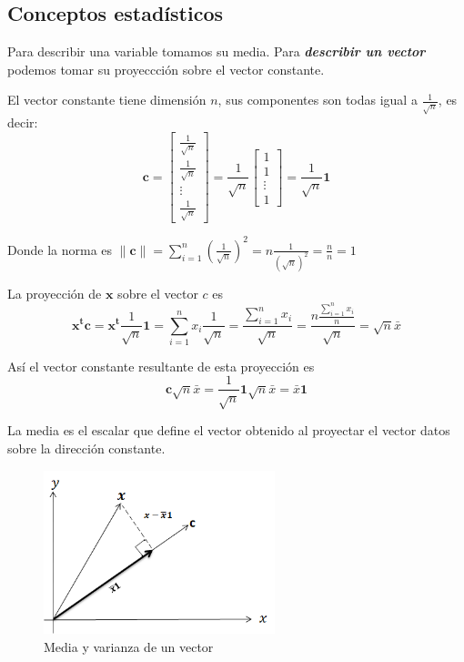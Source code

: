 \documentclass[12pt,letterpaper]{report} %
\begin{document}
\subsection{Conceptos estadísticos}

Para describir una variable tomamos su media. Para \textit{\textbf{describir un vector}} podemos tomar su proyeccción sobre el vector constante.

El vector constante tiene dimensión $n$, sus componentes son todas igual a $\frac{1}{\sqrt{n}}$, es decir:
$$\mathbf{c}=\begin{bmatrix} \frac{1}{\sqrt{n}} \\ \frac{1}{\sqrt{n}} \\ \vdots \\ \frac{1}{\sqrt{n}} \end{bmatrix}=\frac{1}{\sqrt{n}}\begin{bmatrix} 1 \\ 1 \\ \vdots \\ 1 \end{bmatrix}=\frac{1}{\sqrt{n}}\mathbf{1}$$

Donde la norma es $\left\| \mathbf{c} \right\| = \sum_{i=1}^n \left( \frac{1}{\sqrt{n}} \right)^2 = n\frac{1}{(\sqrt{n})^2}=\frac{n}{n}=1$

La proyección de $\mathbf{x}$ sobre el vector $c$ es 
$$\mathbf{x^tc}=\mathbf{x^t}\frac{1}{\sqrt{n}} \mathbf{1}=\sum_{i=1}^n x_i \frac{1}{\sqrt{n}}=\frac{\sum_{i=1}^n x_i}{\sqrt{n}}=\frac{n\frac{\sum_{i=1}^n x_i}{n}}{\sqrt{n}}=\sqrt{n}\bar x$$

Así el vector constante resultante de esta proyección es 
$$\mathbf{c}\sqrt{n}\bar x= \frac{1}{\sqrt{n}}\mathbf{1}\sqrt{n}\bar x=\bar x \mathbf{1}$$

La media es el escalar que define el vector obtenido al proyectar el vector datos sobre la dirección constante. 

\begin{figure}
	\caption{Media y varianza de un vector}
	\centering
	\includegraphics[width=0.6\textwidth]{img/proymed.png}
\end{figure}
\end{document}
